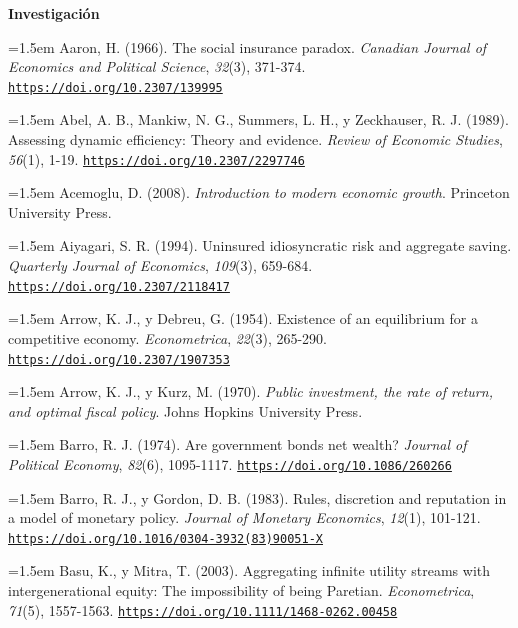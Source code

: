 \documentclass[10pt,a4paper]{article}
\begin{document}
\textbf{Investigación}

\noindent\hangindent=1.5em Aaron, H. (1966). The social insurance paradox. \textit{Canadian Journal of Economics and Political Science}, \textit{32}(3), 371-374. \href{https://doi.org/10.2307/139995}{\nolinkurl{https://doi.org/10.2307/139995}}

\noindent\hangindent=1.5em Abel, A. B., Mankiw, N. G., Summers, L. H., y Zeckhauser, R. J. (1989). Assessing dynamic efficiency: Theory and evidence. \textit{Review of Economic Studies}, \textit{56}(1), 1-19. \href{https://doi.org/10.2307/2297746}{\nolinkurl{https://doi.org/10.2307/2297746}}

\noindent\hangindent=1.5em Acemoglu, D. (2008). \textit{Introduction to modern economic growth}. Princeton University Press.

\noindent\hangindent=1.5em Aiyagari, S. R. (1994). Uninsured idiosyncratic risk and aggregate saving. \textit{Quarterly Journal of Economics}, \textit{109}(3), 659-684. \href{https://doi.org/10.2307/2118417}{\nolinkurl{https://doi.org/10.2307/2118417}}

\noindent\hangindent=1.5em Arrow, K. J., y Debreu, G. (1954). Existence of an equilibrium for a competitive economy. \textit{Econometrica}, \textit{22}(3), 265-290. \href{https://doi.org/10.2307/1907353}{\nolinkurl{https://doi.org/10.2307/1907353}}

\noindent\hangindent=1.5em Arrow, K. J., y Kurz, M. (1970). \textit{Public investment, the rate of return, and optimal fiscal policy}. Johns Hopkins University Press.

\noindent\hangindent=1.5em Barro, R. J. (1974). Are government bonds net wealth? \textit{Journal of Political Economy}, \textit{82}(6), 1095-1117. \href{https://doi.org/10.1086/260266}{\nolinkurl{https://doi.org/10.1086/260266}}

\noindent\hangindent=1.5em Barro, R. J., y Gordon, D. B. (1983). Rules, discretion and reputation in a model of monetary policy. \textit{Journal of Monetary Economics}, \textit{12}(1), 101-121. \href{https://doi.org/10.1016/0304-3932(83)90051-X}{\nolinkurl{https://doi.org/10.1016/0304-3932(83)90051-X}}

\noindent\hangindent=1.5em Basu, K., y Mitra, T. (2003). Aggregating infinite utility streams with intergenerational equity: The impossibility of being Paretian. \textit{Econometrica}, \textit{71}(5), 1557-1563. \href{https://doi.org/10.1111/1468-0262.00458}{\nolinkurl{https://doi.org/10.1111/1468-0262.00458}}
\end{document}
